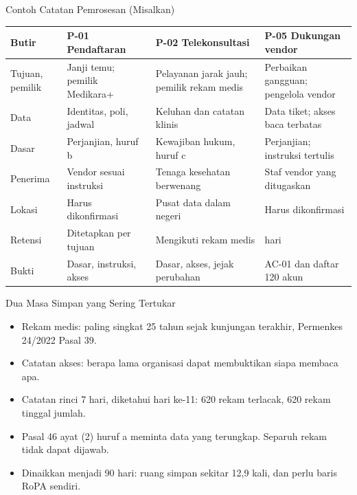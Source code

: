\documentclass[aspectratio=169, table, 12pt]{beamer}
\begin{document}
\begin{frame}{{\Large Contoh Catatan Pemrosesan (Misalkan)}}
  \vspace{2pt}
  \scriptsize
  \begin{tabularx}{\textwidth}{|>{\raggedright\arraybackslash}p{}|>{\raggedright\arraybackslash}X|>{\raggedright\arraybackslash}X|>{\raggedright\arraybackslash}X|}
    \hline
    \textbf{Butir} & \textbf{P-01 Pendaftaran} & \textbf{P-02 Telekonsultasi} & \textbf{P-05
    Dukungan vendor} \\ \hline
    Tujuan, pemilik & Janji temu; pemilik Medikara+ & Pelayanan jarak jauh; pemilik rekam medis &
    Perbaikan gangguan; pengelola vendor \\ \hline
    Data & Identitas, poli, jadwal & Keluhan dan catatan klinis & Data tiket; akses baca terbatas \\
    \hline
    Dasar & Perjanjian, huruf b & Kewajiban hukum, huruf c & Perjanjian; instruksi tertulis \\
    \hline
    Penerima & Vendor sesuai instruksi & Tenaga kesehatan berwenang & Staf vendor yang ditugaskan \\
    \hline
    Lokasi & Harus dikonfirmasi & Pusat data dalam negeri & Harus dikonfirmasi \\ \hline
    Retensi & Ditetapkan per tujuan & Mengikuti rekam medis & 90 hari \\ \hline
    Bukti & Dasar, instruksi, akses & Dasar, akses, jejak perubahan & AC-01 dan daftar 120 akun \\
    \hline
  \end{tabularx}
\end{frame}

\begin{frame}{{\Large Dua Masa Simpan yang Sering Tertukar}}
  \vspace{6pt}
  \small
  \begin{itemize}
    \item Rekam medis: paling singkat 25 tahun sejak kunjungan terakhir, Permenkes 24/2022 Pasal 39.
    \item Catatan akses: berapa lama organisasi dapat membuktikan siapa membaca apa.
    \item Catatan rinci 7 hari, diketahui hari ke-11: 620 rekam terlacak, 620 rekam tinggal jumlah.
    \item Pasal 46 ayat (2) huruf a meminta data yang terungkap. Separuh rekam tidak dapat dijawab.
    \item Dinaikkan menjadi 90 hari: ruang simpan sekitar 12,9 kali, dan perlu baris RoPA sendiri.
  \end{itemize}
\end{frame}
\end{document}
